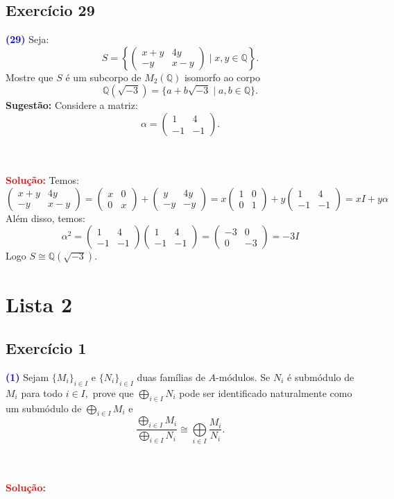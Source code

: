 \documentclass[11pt,a4paper]{article}
\newcommand{\exercicio}[1]{\subsection{Exercício #1} \textcolor{blue}{\bf(#1)}}
\newcommand{\solucao}[1]{
\textbf{\textcolor{white}{oi}\\ \\ \textcolor{red}{Solução:}} #1}
\begin{document}
\exercicio{29} Seja:
\[
S=\left\{\begin{pmatrix}
x+y&4y\\-y&x-y
\end{pmatrix}\mid x,y\in\mathbb{Q}\right\}.
\]
Mostre que $S$ é um subcorpo de $M_2(\mathbb{Q})$ isomorfo ao corpo
\[
\mathbb{Q}(\sqrt{-3})=\{a+b\sqrt{-3}\mid a,b\in\mathbb{Q}\}.
\]
\textbf{Sugestão:} Considere a matriz:
\[
\alpha=\begin{pmatrix}
1&4\\-1&-1
\end{pmatrix}.
\]
\solucao{Temos:
\[
\begin{pmatrix}
x+y&4y\\-y&x-y
\end{pmatrix}
=\begin{pmatrix}
x&0\\0&x
\end{pmatrix}+\begin{pmatrix}
y&4y\\-y&-y
\end{pmatrix}=
x\begin{pmatrix}
1&0\\0&1
\end{pmatrix}+y\begin{pmatrix}
1&4\\-1&-1
\end{pmatrix}=xI+y\alpha
\]
Além disso, temos:
\[
\alpha^2=\begin{pmatrix}
1&4\\-1&-1
\end{pmatrix}\begin{pmatrix}
1&4\\-1&-1
\end{pmatrix}=\begin{pmatrix}
-3&0\\0&-3
\end{pmatrix}=-3I
\]
Logo $S\cong\mathbb{Q}(\sqrt{-3})$.
}
\newpage
\section{\textcolor{Floresta}{Lista 2}}

\exercicio{1} Sejam $\{ M_i\}_{i \in I}$ e $\{ N_i\}_{i \in I}$ duas famílias de $A$-módulos. Se $N_i$ é submódulo de $M_i$ para todo $i \in I,$ prove que $\bigoplus\limits_{i \in I} N_i$ pode ser identificado naturalmente como um submódulo de $\bigoplus\limits_{i \in I} M_i$ e   \[\frac{\bigoplus\limits_{i \in I} M_i}{\bigoplus\limits_{i \in I} N_i } \cong \bigoplus\limits_{i \in I} \frac{M_i}{N_i}.\] 
\solucao{}
\end{document}
